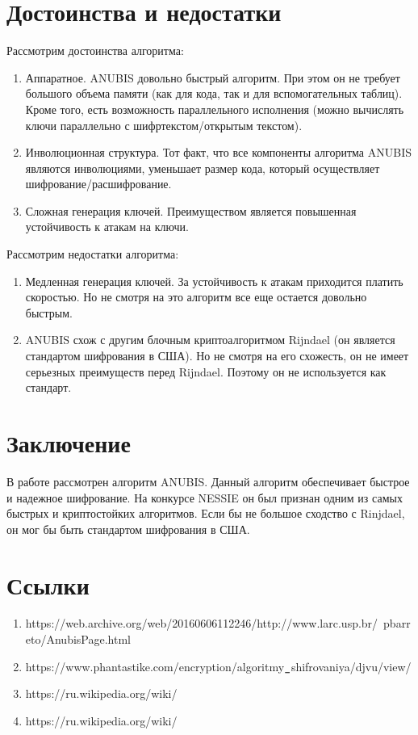 \documentclass[12pt]{article}
\begin{document}
\section{Достоинства и недостатки}
Рассмотрим достоинства алгоритма:
\begin{enumerate}
    \item Аппаратное. ANUBIS довольно быстрый алгоритм. При этом он не требует большого объема памяти (как для кода, так и для вспомогательных таблиц). Кроме того, есть возможность параллельного исполнения (можно вычислять ключи параллельно с шифртекстом/открытым текстом).
    \item Инволюционная структура. Тот факт, что все компоненты алгоритма ANUBIS являются инволюциями, уменьшает размер кода, который осуществляет шифрование/расшифрование.
    \item Сложная генерация ключей. Преимуществом является повышенная устойчивость к атакам на ключи.
\end{enumerate}
\newline
Рассмотрим недостатки алгоритма:
\begin{enumerate}
    \item Медленная генерация ключей. За устойчивость к атакам приходится платить скоростью. Но не смотря на это алгоритм все еще остается довольно быстрым.
    \item ANUBIS схож с другим блочным криптоалгоритмом Rijndael (он является стандартом шифрования в США). Но не смотря на его схожесть, он не имеет серьезных преимуществ перед Rijndael. Поэтому он не используется как стандарт.
\end{enumerate}

\section{Заключение}
В работе рассмотрен алгоритм ANUBIS. Данный алгоритм обеспечивает быстрое и надежное шифрование. На конкурсе NESSIE он был признан одним из самых быстрых и криптостойких алгоритмов. Если бы не большое сходство с Rinjdael, он мог бы быть стандартом шифрования в США.

\section{Ссылки}
\begin{enumerate}
    \item https://web.archive.org/web/20160606112246/http://www.larc.usp.br/~pbarreto/AnubisPage.html
    \item 
    https://www.phantastike.com/encryption/algoritmy$\verb|_|$shifrovaniya/djvu/view/
    \item https://ru.wikipedia.org/wiki/%
    \item https://ru.wikipedia.org/wiki/%
\end{enumerate}
\end{document}
